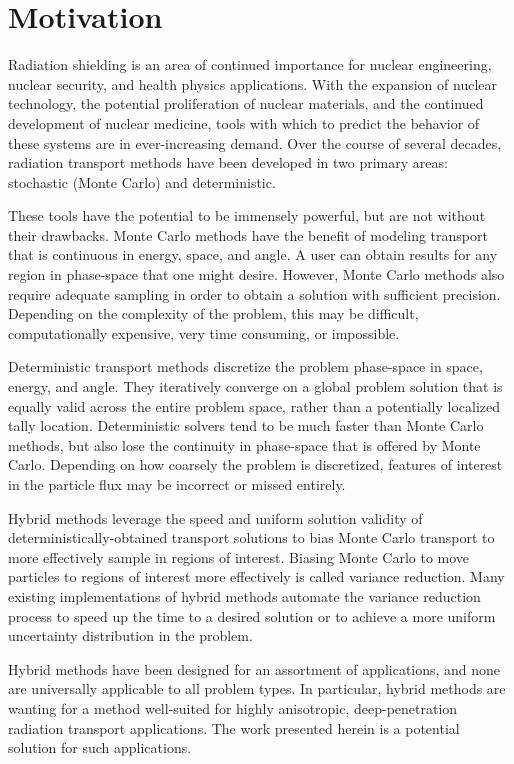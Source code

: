 \section{Motivation}
\label{sec:motivation}

Radiation shielding is an area of continued importance for nuclear engineering, nuclear security, 
and health physics applications. With the expansion of nuclear technology,
the potential proliferation of nuclear materials, and the continued development of
nuclear medicine, tools with which to predict the behavior
of these systems are
in ever-increasing demand. Over the course of several decades, radiation
transport methods have been developed in two primary areas: stochastic (Monte
Carlo) and
deterministic.

These tools have the potential to be immensely
powerful, but are not without their drawbacks. Monte Carlo methods have the
benefit of modeling transport that is continuous in energy, space, and angle.
A user can obtain results for any region in phase-space that one might desire.
However, Monte Carlo methods also require adequate sampling in order to obtain a
solution with sufficient precision.
 Depending on the complexity of the problem,
this may be difficult, computationally expensive, very time consuming,
or impossible.

Deterministic
transport methods discretize the problem phase-space in space, energy, and
angle. They iteratively converge on a global problem solution that is equally
valid across the entire problem space, rather than a potentially localized tally
location. Deterministic solvers tend to be much faster than Monte Carlo methods, but also lose
the continuity in phase-space that is offered by Monte Carlo. Depending on how
coarsely the problem is discretized, features of interest in the particle flux may
be incorrect or missed entirely.

Hybrid methods leverage the speed and uniform solution validity of
deterministically-obtained transport solutions to bias Monte Carlo transport to
more effectively sample in regions of interest. Biasing Monte Carlo to move
particles to regions of interest more effectively is called variance reduction. Many existing
implementations of hybrid methods
automate the variance reduction process to speed up the time to a
desired solution or to achieve a more uniform uncertainty distribution in the
problem.

Hybrid methods have been designed for an assortment of applications, and none are
universally applicable to all problem types. In particular, hybrid methods are
wanting for a method well-suited for
highly anisotropic, deep-penetration radiation transport applications. The work
presented herein is a potential solution for such applications.
